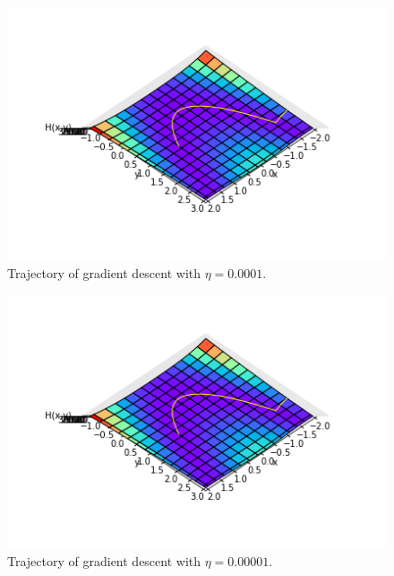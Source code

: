 \documentclass[a4paper,11pt]{article}
\theoremstyle{mytheor}
\begin{document}
\begin{enumerate}
\begin{figure}[h!]
   \centering
   \includegraphics[scale=0.92]{trajectory00001y267391}\vspace{-1.9cm}
   \caption{\vspace{-0.2cm} Trajectory of gradient descent with $\eta = 0.0001$.\vspace{-0.4cm}}
  \end{figure}\vspace{-0.5cm}
 
\begin{figure}[h!]
   \centering
   \includegraphics[scale=0.92]{trajectory1e-05y2674138}\vspace{-1.9cm}
   \caption{\vspace{-0.2cm} Trajectory of gradient descent with $\eta = 0.00001$.}
  \end{figure}
\end{enumerate}

\pagebreak
\end{document}

